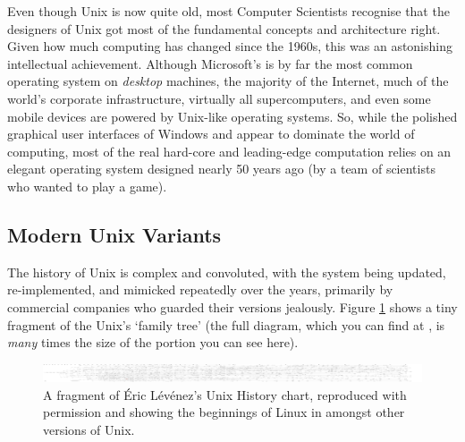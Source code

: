 
Even though Unix is now quite old, most Computer Scientists recognise that the designers of Unix got most of the fundamental concepts and
architecture right. Given how much computing has changed since the 1960s, this was an astonishing intellectual achievement. Although Microsoft's  is by far the most common operating system on \emph{desktop} machines, the majority of the Internet, much of the world's corporate infrastructure, virtually all supercomputers, and even some mobile devices are powered by Unix-like operating systems. So, while the polished graphical user interfaces of Windows and  appear to dominate the world of computing, most of the real hard-core and leading-edge computation relies on an elegant operating system designed nearly 50 years ago (by a team of scientists who wanted to play a game).

\subsection{Modern Unix Variants}
\label{sec:modern-unix-variants}


The history of Unix is complex and convoluted, with the system being updated, re-implemented, and mimicked repeatedly over the years, primarily by commercial companies who guarded their versions jealously. Figure \ref{fig:unix-history} shows a tiny fragment of the Unix's `family tree' (the full diagram, which you can find at , is \emph{many} times the size of the portion you can see here).

\begin{figure}[h!tb]
  \begin{center}
    \includegraphics[width=13cm]{images/unix}
  \end{center}
\caption{A fragment of \'{E}ric L\'{e}v\'{e}nez's Unix History chart, reproduced with permission and showing the beginnings of Linux in amongst other versions of Unix.}
\label{fig:unix-history}
\end{figure}

